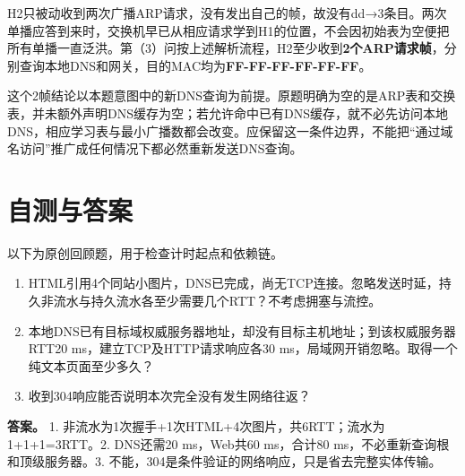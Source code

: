 H2只被动收到两次广播ARP请求，没有发出自己的帧，故没有dd→3条目。两次单播应答到来时，交换机早已从相应请求学到H1的位置，不会因初始表为空便把所有单播一直泛洪。第（3）问按上述解析流程，H2至少收到\textbf{2个ARP请求帧}，分别查询本地DNS和网关，目的MAC均为\textbf{FF-FF-FF-FF-FF-FF}。

这个2帧结论以本题意图中的新DNS查询为前提。原题明确为空的是ARP表和交换表，并未额外声明DNS缓存为空；若允许命中已有DNS缓存，就不必先访问本地DNS，相应学习表与最小广播数都会改变。应保留这一条件边界，不能把``通过域名访问''推广成任何情况下都必然重新发送DNS查询。

\section{自测与答案}\label{cn-ch6-review}

以下为原创回顾题，用于检查计时起点和依赖链。

\begin{enumerate}
\def\labelenumi{\arabic{enumi}.}
\tightlist
\item
  HTML引用4个同站小图片，DNS已完成，尚无TCP连接。忽略发送时延，持久非流水与持久流水各至少需要几个RTT？不考虑拥塞与流控。
\item
  本地DNS已有目标域权威服务器地址，却没有目标主机地址；到该权威服务器RTT20 ms，建立TCP及HTTP请求响应各30 ms，局域网开销忽略。取得一个纯文本页面至少多久？
\item
  收到304响应能否说明本次完全没有发生网络往返？
\end{enumerate}

\textbf{答案。} 1. 非流水为1次握手+1次HTML+4次图片，共6RTT；流水为1+1+1=3RTT。2. DNS还需20 ms，Web共60 ms，合计80 ms，不必重新查询根和顶级服务器。3. 不能，304是条件验证的网络响应，只是省去完整实体传输。
